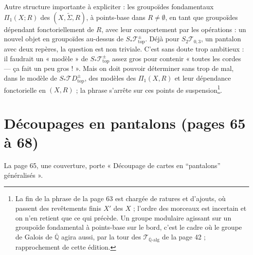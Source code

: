 \documentclass[11pt,a4paper]{article}
\begin{document}
Autre structure importante à expliciter : les groupoïdes fondamentaux $\Pi_1(X;
R)$ des $(X, \widetilde{\Sigma}, R)$, à points-base dans $R \neq \emptyset$, en
tant que groupoïdes dépendant fonctoriellement de $R$, avec leur comportement
par les opérations : un nouvel objet en groupoïdes au-dessus de
$S_{*}\mathcal{T}^{\pm}_{\mathrm{top}}$. Déjà pour $S_2\mathcal{T}_{0,3}$, un
pantalon avec deux repères, la question est non triviale. C'est sans doute trop
ambitieux : il faudrait un « modèle » de $S_{*}\mathcal{T}^{\pm}_{\mathrm{top}}$
assez gros pour contenir « toutes les cordes — ça fait un peu gros ! ». Mais on
doit pouvoir déterminer sans trop de mal, dans le modèle de
$S_{*}\mathcal{T}D^{\pm}_{\mathrm{top}}$, des modèles des $\Pi_1(X, R)$ et leur
dépendance fonctorielle en $(X, R)$ ; la phrase s'arrête sur ces points de
suspension\footnote{La fin de la phrase de la page 63 est chargée de ratures et
d'ajouts, où passent des revêtements finis $X'$ des $X$ ; l'ordre des morceaux
est incertain et on n'en retient que ce qui précède. Un groupe modulaire agissant
sur un groupoïde fondamental à points-base sur le bord, c'est le cadre où le
groupe de Galois de $\overline{\mathbb{Q}}$ agira aussi, par la tour des
$\mathcal{T}_{\overline{\mathbb{Q}}\text{-alg}}$ de la page 42 ;
rapprochement de cette édition.}.

\section*{Découpages en pantalons (pages 65 à 68)}

La page 65, une couverture, porte « Découpage de cartes en “pantalons”
généralisés ».
\end{document}

